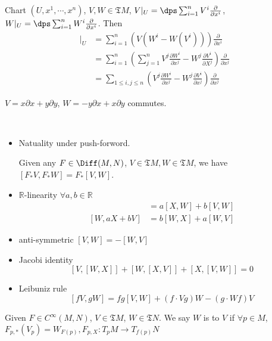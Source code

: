 \begin{proposition}
    Chart  $ (U,x^1,\cdots,x^n) $,  $ V,W\in \mathfrak{T}M $,  $ V|_U=\dps\sum_{i=1}^n V^i\frac{\partial }{\partial  x^i} $,  $ W|_U=\dps\sum_{i=1}^nW^i\frac{\partial}{\partial x^i} $. Then 
    \begin{align*}
        [V,W]|_U&=\sum_{i=1}^n(V(W^i-W(V^i)))\frac{\partial}{\partial x^i}\\
        &=\sum_{i=1}^n(\sum_{j=1}^nV^j\frac{\partial W^i}{\partial x^j}-W^j\frac{\partial V^i}{\partial X^j})\frac{\partial }{\partial x^j}\\
        &=\sum_{1 \leq i,j \leq n}(V^j\frac{\partial W^i}{\partial x^j}-W^j\frac{\partial V^i}{\partial x^j})\frac{\partial}{\partial x^j}
    \end{align*}
\end{proposition}
\begin{example}
     $ V=x\partial x+y\partial y $,  $ W=-y\partial x+x\partial y $ commutes.  
\end{example}
\begin{proposition}
    \,
    \begin{itemize}
        \item Natuality under push-forword.
        
        Given any  $ F\in \Diff(M,N) $,  $ V\in \mathfrak{T}M, W\in \mathfrak{T}M  $, we have  $ [F_*V,F_*W]=F_*[V,W] $.
        \item  $ \mathbb{R} $-linearity  $ \forall a,b\in \mathbb{R} $
        \begin{align*}
            [aX+bV,W]&=a[X,W]+b[V,W]\\
            [W,aX+bV]&=b[W,X]+a[W,V]
        \end{align*}  
        
        \item anti-symmetric  $ [V,W]=-[W,V] $
        \item Jacobi identity 
        \[[V,[W,X]]+[W,[X,V]]+[X,[V,W]]=0\]     
        \item Leibuniz rule 
        \[[fV,gW]=fg[V,W]+(f\cdot Vg)W-(g\cdot Wf)V\]
    \end{itemize}
\end{proposition}
\begin{definition}
    Given  $ F\in C^\infty(M,N) $,  $ V\in \mathfrak{T}M $,  $ W\in \mathfrak{T}N $. We say  $ W $ is   to  $ V $ if  $ \forall p\in M $,  $ F_{p,*}(V_p)=W_{F(p)}, F_{p,X}:T_pM\rightarrow T_{f(p)}N $      
\end{definition}
